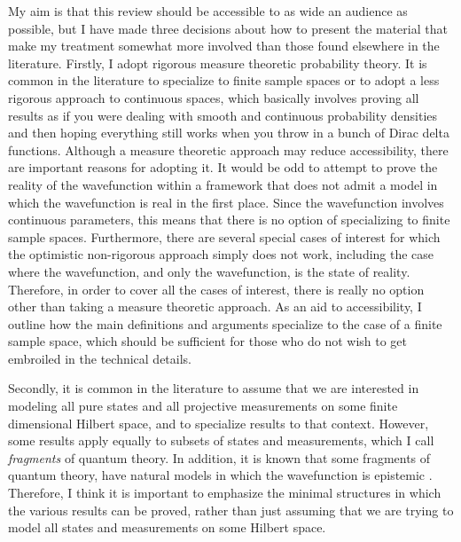 \documentclass[DIV=calc,paper=a4,fontsize=11pt,twocolumn]{scrartcl} %
\theoremstyle{definition}
\theoremstyle{plain}
\begin{document}
My aim is that this review should be accessible to as wide an audience
as possible, but I have made three decisions about how to present the
material that make my treatment somewhat more involved than those
found elsewhere in the literature.  Firstly, I adopt rigorous measure
theoretic probability theory.  It is common in the literature to
specialize to finite sample spaces or to adopt a less rigorous
approach to continuous spaces, which basically involves proving all
results as if you were dealing with smooth and continuous probability
densities and then hoping everything still works when you throw in a
bunch of Dirac delta functions.  Although a measure theoretic approach
may reduce accessibility, there are important reasons for adopting it.
It would be odd to attempt to prove the reality of the wavefunction
within a framework that does not admit a model in which the
wavefunction is real in the first place.  Since the wavefunction
involves continuous parameters, this means that there is no option of
specializing to finite sample spaces.  Furthermore, there are several
special cases of interest for which the optimistic non-rigorous
approach simply does not work, including the case where the
wavefunction, and only the wavefunction, is the state of reality.
Therefore, in order to cover all the cases of interest, there is
really no option other than taking a measure theoretic approach.  As
an aid to accessibility, I outline how the main definitions and
arguments specialize to the case of a finite sample space, which
should be sufficient for those who do not wish to get embroiled in the
technical details.

Secondly, it is common in the literature to assume that we are
interested in modeling all pure states and all projective
measurements on some finite dimensional Hilbert space, and to
specialize results to that context.  However, some results apply
equally to subsets of states and measurements, which I call
\emph{fragments} of quantum theory.  In addition, it is known that
some fragments of quantum theory, have natural models in which the
wavefunction is epistemic \cite{Spekkens2007, Schreiber,
Bartlett2012}.  Therefore, I think it is important to emphasize the
minimal structures in which the various results can be proved, rather
than just assuming that we are trying to model all states and
measurements on some Hilbert space.
\end{document}
